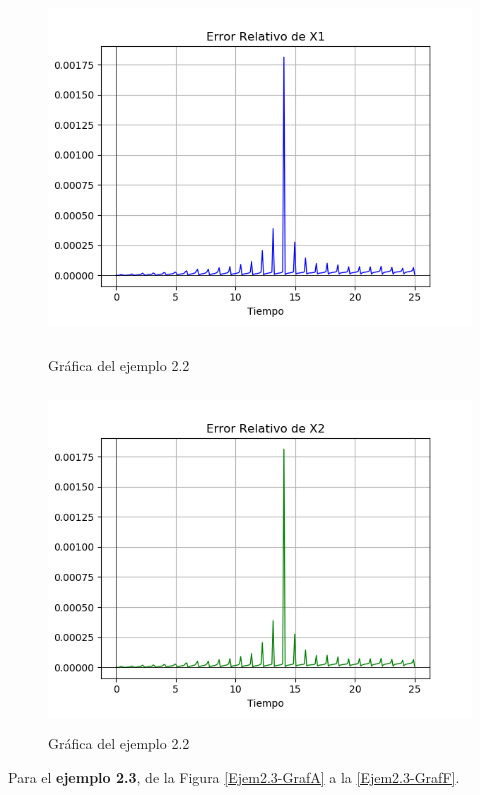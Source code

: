 \begin{figure}[h!]
	\begin{center}
        \includegraphics[height=9cm]{Ejem2_2-GrafErr1}
        \caption{Gráfica del ejemplo 2.2}

        \includegraphics[height=9cm]{Ejem2_2-GrafErr2}
        \caption{Gráfica del ejemplo 2.2}
        \label{Ejem2.2-GrafErr2}
    \end{center}
\end{figure}

Para el \textbf{ejemplo 2.3}, de la Figura \ref{Ejem2.3-GrafA} a la \ref{Ejem2.3-GrafF}.

